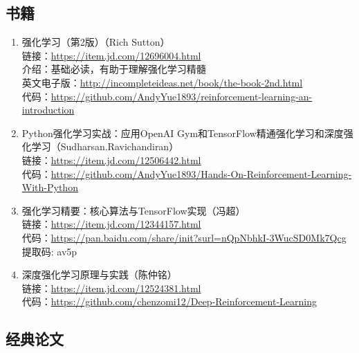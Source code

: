\documentclass[lang=cn,11pt,a4paper]{elegant_template}
\begin{document}
\subsection{书籍}
\begin{enumerate}
    \item 强化学习（第2版）（Rich Sutton）\\ 链接：\href{https://item.jd.com/12696004.html}{https://item.jd.com/12696004.html} \\
    介绍：基础必读，有助于理解强化学习精髓 \\
    英文电子版：\href{http://incompleteideas.net/book/the-book-2nd.html}{http://incompleteideas.net/book/the-book-2nd.html}  \\
    代码：\href{https://github.com/AndyYue1893/reinforcement-learning-an-introduction}{https://github.com/AndyYue1893/reinforcement-learning-an-introduction}  
    \item Python强化学习实战：应用OpenAI Gym和TensorFlow精通强化学习和深度强化学习（Sudharsan.Ravichandiran）\\
    链接：\href{https://item.jd.com/12506442.html}{https://item.jd.com/12506442.html}  \\
    代码：\href{https://github.com/AndyYue1893/Hands-On-Reinforcement-Learning-With-Python}{https://github.com/AndyYue1893/Hands-On-Reinforcement-Learning-With-Python} 
    \item 强化学习精要：核心算法与TensorFlow实现（冯超）\\
    链接：\href{https://item.jd.com/12344157.html}{https://item.jd.com/12344157.html}  \\
    代码：\href{https://pan.baidu.com/share/init?surl=nQpNbhkI-3WucSD0Mk7Qcg}{https://pan.baidu.com/share/init?surl=nQpNbhkI-3WucSD0Mk7Qcg} 提取码: av5p
    \item 深度强化学习原理与实践（陈仲铭）\\
    链接：\href{https://item.jd.com/12524381.html}{https://item.jd.com/12524381.html} \\
    代码：\href{https://github.com/chenzomi12/Deep-Reinforcement-Learning}{https://github.com/chenzomi12/Deep-Reinforcement-Learning} 
\end{enumerate}

\subsection{经典论文}
\end{document}
